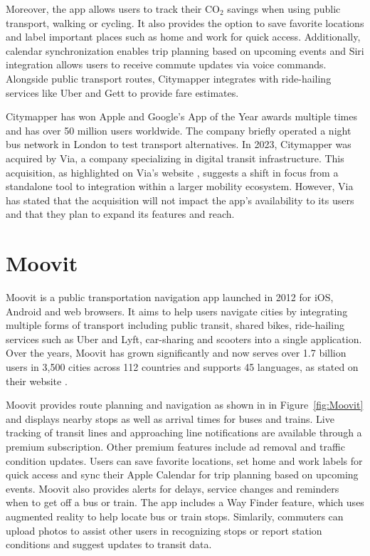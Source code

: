 Moreover, the app allows users to track their CO$_2$ savings when using public transport, walking or cycling. 
It also provides the option to save favorite locations and label important places such as home and work for quick access. 
Additionally, calendar synchronization enables trip planning based on upcoming events and Siri integration allows users to receive commute updates via voice commands.
Alongside public transport routes, Citymapper integrates with ride-hailing services like Uber and Gett to provide fare estimates.

Citymapper has won Apple and Google's App of the Year awards multiple times and has over 50 million users worldwide.
The company briefly operated a night bus network in London to test transport alternatives. 
In 2023, Citymapper was acquired by Via, a company specializing in digital transit infrastructure.
This acquisition, as highlighted on Via's website \cite{via_acquires_citymapper}, suggests a shift in focus from a standalone tool to integration within a larger mobility ecosystem.
However, Via has stated that the acquisition will not impact the app's availability to its users and that they plan to expand its features and reach.

\section{Moovit}
Moovit is a public transportation navigation app launched in 2012 for iOS, Android and web browsers.
It aims to help users navigate cities by integrating multiple forms of transport including public transit, shared bikes, ride-hailing services such as Uber and Lyft, car-sharing and scooters into a single application.
Over the years, Moovit has grown significantly and now serves over 1.7 billion users in 3,500 cities across 112 countries and supports 45 languages, as stated on their website \cite{moovit_about}.

Moovit provides route planning and navigation as shown in in Figure~\ref{fig:Moovit} and displays nearby stops as well as arrival times for buses and trains.
Live tracking of transit lines and approaching line notifications are available through a premium subscription.
Other premium features include ad removal and traffic condition updates.
Users can save favorite locations, set home and work labels for quick access and sync their Apple Calendar for trip planning based on upcoming events.
Moovit also provides alerts for delays, service changes and reminders when to get off a bus or train.
The app includes a Way Finder feature, which uses augmented reality to help locate bus or train stops. 
Simlarily, commuters can upload photos to assist other users in recognizing stops or report station conditions and suggest updates to transit data.

